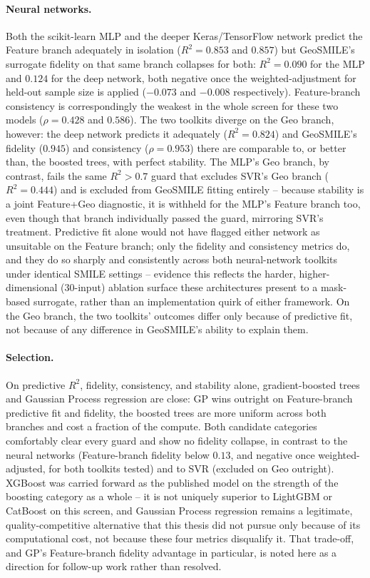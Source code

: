 \paragraph{Neural networks.} Both the scikit-learn MLP and the deeper
Keras/TensorFlow network predict the Feature branch adequately in isolation
($R^2=0.853$ and $0.857$) but GeoSMILE's surrogate fidelity on that same
branch collapses for both: $R^2=0.090$ for the MLP and $0.124$ for the deep
network, both negative once the weighted-adjustment for held-out sample size
is applied ($-0.073$ and $-0.008$ respectively). Feature-branch consistency
is correspondingly the weakest in the whole screen for these two models
($\rho=0.428$ and $0.586$). The two toolkits diverge on the Geo branch,
however: the deep network predicts it adequately ($R^2=0.824$) and GeoSMILE's
fidelity ($0.945$) and consistency ($\rho=0.953$) there are comparable to, or
better than, the boosted trees, with perfect stability. The MLP's Geo branch,
by contrast, fails the same $R^2>0.7$ guard that excludes SVR's Geo branch
($R^2=0.444$) and is excluded from GeoSMILE fitting entirely -- because
stability is a joint Feature+Geo diagnostic, it is withheld for the MLP's
Feature branch too, even though that branch individually passed the guard,
mirroring SVR's treatment. Predictive fit alone would not have flagged either
network as unsuitable on the Feature branch; only the fidelity and
consistency metrics do, and they do so sharply and consistently across both
neural-network toolkits under identical SMILE settings -- evidence this
reflects the harder, higher-dimensional (30-input) ablation surface these
architectures present to a mask-based surrogate, rather than an
implementation quirk of either framework. On the Geo branch, the two
toolkits' outcomes differ only because of predictive fit, not because of any
difference in GeoSMILE's ability to explain them.

\paragraph{Selection.} On predictive $R^2$, fidelity, consistency, and
stability alone, gradient-boosted trees and Gaussian Process regression are
close: GP wins outright on Feature-branch predictive fit and fidelity, the
boosted trees are more uniform across both branches and cost a fraction of
the compute. Both candidate categories comfortably clear
every guard and show no fidelity collapse, in contrast to the neural
networks (Feature-branch fidelity below $0.13$, and negative once
weighted-adjusted, for both toolkits tested) and to SVR (excluded on Geo
outright). XGBoost was carried forward as the published model on the
strength of the boosting category as a whole -- it is not uniquely superior
to LightGBM or CatBoost on this screen, and Gaussian Process regression
remains a legitimate, quality-competitive alternative that this thesis did
not pursue only because of its computational cost, not because these four
metrics disqualify it. That trade-off, and GP's Feature-branch fidelity
advantage in particular, is noted here as a direction for follow-up work
rather than resolved.
